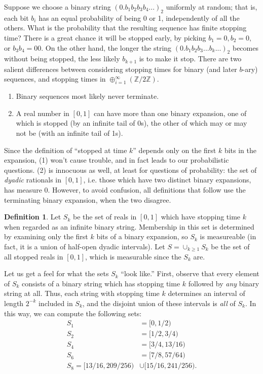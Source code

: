 \documentclass[12pt]{amsart}
\newcommand{\Z}{\mathbb{Z}}
\theoremstyle{definition}
\newtheorem{definition}{Definition}
\begin{document}

Suppose we choose a binary string $(0.b_1 b_2 b_3 b_4 ...)_2$ uniformly at random; that is,
each bit $b_i$ has an equal probability of being 0 or 1, independently of all the others. 
What is the probability that the resulting sequence has finite stopping time? There is a great chance
it will be stopped early, by picking $b_1=0, b_2=0,$ or $b_3 b_4 = 00.$ On the other hand, the longer the string
$(0.b_1 b_2 b_3 ... b_k ...)_2$ becomes without being stopped, 
the less likely $b_{k+1}$ is to make it stop.
There are two salient differences between considering stopping times for binary (and later $b$-ary)
sequences, and stopping times in $\oplus_{i=1}^\infty (\Z/2\Z).$ 
\begin{enumerate}
\item Binary sequences
most likely never terminate. 
\item A real number in $[0,1]$ can have more than one binary expansion,
one of which is stopped (by an infinite tail of 0s), the other of which may or may not be (with an infinite tail of 1s).
\end{enumerate}
Since the definition of ``stopped at time $k$'' depends only on the first $k$ bits in the expansion,
(1) won't cause trouble, and in fact leads to our probabilistic questions.
(2) is innocuous as well, at least for questions of probability: the set of \emph{dyadic} rationals
in $[0,1]$, i.e. those which have two distinct binary expansions, has measure 0.
However, to avoid confusion, all definitions that follow use the terminating binary expansion, when the two disagree.

\begin{definition}
    Let $S_k$ be the set of reals in $[0, 1]$ which have stopping time $k$ when
    regarded as an infinite binary string. Membership in this set is determined
    by examining only the first $k$ bits of a binary expansion, so $S_k$ is
    measureable (in fact, it is a union of half-open dyadic intervals). Let $S = \cup_{k \geq 1} S_k$ be the set of all stopped reals
    in $[0, 1]$, which is measurable since the $S_k$ are.
\end{definition}

Let us get a feel for what the sets $S_k$ ``look like.'' First, observe that
every element of $S_k$ consists of a binary string which has stopping time $k$
followed by \emph{any} binary string at all. Thus, each string with stopping
time $k$ determines an interval of length $2^{-k}$ included in $S_k$, and the
disjoint union of these intervals is \emph{all} of $S_k$. In this way, we can
compute the following sets:
\begin{align*}
    S_1 &= [0, 1/2) \\
    S_2 &= [1/2, 3/4) \\
    S_4 &= [3/4, 13/16) \\
    S_6 &= [7/8, 57/64) \\
    S_8 = [13/16, 209/256) &\cup [15/16, 241/256).
\end{align*}
\end{document}
